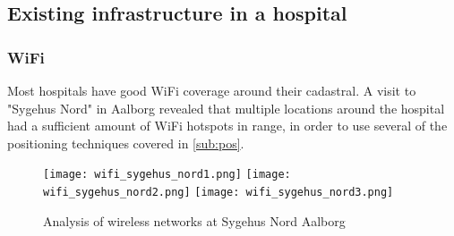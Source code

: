 \subsection{Existing infrastructure in a hospital} \label{sub:infra}

\subsubsection{WiFi}

Most hospitals have good WiFi coverage around their cadastral. A visit to "Sygehus Nord" in Aalborg revealed that multiple locations around the hospital had a sufficient amount of WiFi hotspots in range, in order to use several of the positioning techniques covered in \cref{sub:pos}.




\begin{figure}[htb]
	\begin{center} 
		{\texttt{[image: wifi\_sygehus\_nord1.png]}}
		\quad
		{\texttt{[image: wifi\_sygehus\_nord2.png]}}
		\quad
		{\texttt{[image: wifi\_sygehus\_nord3.png]}}
\end{center}
\caption{Analysis of wireless networks at Sygehus Nord Aalborg}
\label{fig:stefanResidual}
\end{figure}